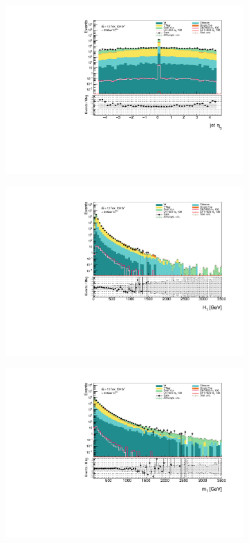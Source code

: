 \documentclass[12pt, a4paper]{book}
\begin{document}
\begin{figure}[!ht]
\begin{subfigure}[b]{0.49\textwidth}
    \end{subfigure}
    \begin{subfigure}[b]{0.49\textwidth}
        \centering
        \includegraphics[width=\textwidth]{eta3_jet.pdf}
    \end{subfigure}
    \begin{subfigure}[b]{0.49\textwidth}
        \centering
        \includegraphics[width=\textwidth]{ht.pdf}
    \end{subfigure}
    \begin{subfigure}[b]{0.49\textwidth}
        \centering
        \includegraphics[width=\textwidth]{mt.pdf}

\end{subfigure}
\end{figure}
\end{document}
